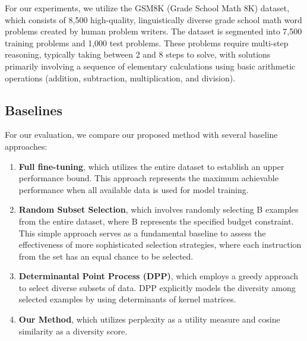 \documentclass{article}
\begin{document}
For our experiments, we utilize the GSM8K (Grade School Math 8K) dataset, which consists of 8,500 high-quality, linguistically diverse grade school math word problems created by human problem writers. The dataset is segmented into 7,500 training problems and 1,000 test problems. These problems require multi-step reasoning, typically taking between 2 and 8 steps to solve, with solutions primarily involving a sequence of elementary calculations using basic arithmetic operations (addition, subtraction, multiplication, and division).



\subsection{Baselines}

For our evaluation, we compare our proposed method with several baseline approaches:
\begin{enumerate}
    \item  \textbf{Full fine-tuning}, which utilizes the entire dataset to establish an upper performance bound. This approach represents the maximum achievable performance when all available data is used for model training.

    \item  \textbf{Random Subset Selection}, which involves randomly selecting B examples from the entire dataset, where B represents the specified budget constraint. This simple approach serves as a fundamental baseline to assess the effectiveness of more sophisticated selection strategies, where each instruction from the set has an equal chance to be selected.

    \item  \textbf{Determinantal Point Process (DPP)}, which employs a greedy approach to select diverse subsets of data. DPP explicitly models the diversity among selected examples by using determinants of kernel matrices.

    \item \textbf{Our Method}, which utilizes perplexity as a utility measure and cosine similarity as a diversity score.
\end{enumerate}
\end{document}

